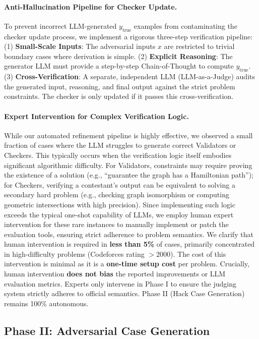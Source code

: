 \documentclass[11pt]{article}
\begin{document}
{\paragraph{Anti-Hallucination Pipeline for Checker Update.} To prevent incorrect LLM-generated $y_{\text{true}}$ examples from contaminating the checker update process, we implement a rigorous three-step verification pipeline: (1) \textbf{Small-Scale Inputs}: The adversarial inputs $x$ are restricted to trivial boundary cases where derivation is simple. (2) \textbf{Explicit Reasoning}: The generator LLM must provide a step-by-step Chain-of-Thought to compute $y_{\text{true}}$. (3) \textbf{Cross-Verification}: A separate, independent LLM (LLM-as-a-Judge) audits the generated input, reasoning, and final output against the strict problem constraints. The checker is only updated if it passes this cross-verification.}

\paragraph{Expert Intervention for Complex Verification Logic.}
While our automated refinement pipeline is highly effective, we observed a small fraction of cases where the LLM struggles to generate correct Validators or Checkers.
This typically occurs when the verification logic itself embodies significant algorithmic difficulty. 
For Validators, constraints may require proving the existence of a solution (e.g., ``guarantee the graph has a Hamiltonian path''); for Checkers, verifying a contestant's output can be equivalent to solving a secondary hard problem (e.g., checking graph isomorphism or computing geometric intersections with high precision). 
Since implementing such logic exceeds the typical one-shot capability of LLMs, we employ human expert intervention for these rare instances to manually implement or patch the evaluation tools, ensuring strict adherence to problem semantics. {We clarify that human intervention is required in \textbf{less than 5\%} of cases, primarily concentrated in high-difficulty problems (Codeforces rating $> 2000$). The cost of this intervention is minimal as it is a \textbf{one-time setup cost} per problem. Crucially, human intervention \textbf{does not bias} the reported improvements or LLM evaluation metrics. Experts only intervene in Phase I to ensure the judging system strictly adheres to official semantics. Phase II (Hack Case Generation) remains 100\% autonomous.}

\subsection{Phase II: Adversarial Case Generation}
\label{sec:phase2_execution}
\end{document}
